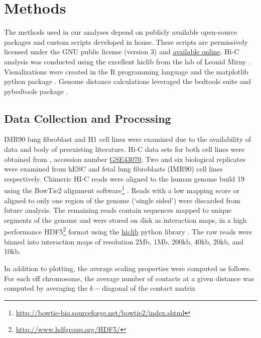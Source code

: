 \chapter{Methods}

The methods used in our analyses depend on publicly available open-source packages and custom scripts developed in house.
These scripts are permissively licensed under the GNU public license (version 3) and
\href{https://github.com/New-College-of-Florida/Jonathan-Niles-Thesis}{\underline{available online}}.  Hi-C analysis was conducted using
the excellent hiclib from the lab of Leonid Mirny \citep{imakaev2012}.  Visualizations were created in the R programming
language \citep{r2014} and the matplotlib python package \citep{hunter2007}.  Genome distance calculations leveraged the
bedtools suite \citep{quinlan2010} and pybedtools package \citep{dale2011}.

\section*{Data Collection and Processing}

IMR90 lung fibroblast and H1  cell lines were examined due to the availability of data and body of preexisting
literature.  Hi-C data sets for both cell lines were obtained from  \citep{edgar2002}, accession number
\href{http://www.ncbi.nlm.nih.gov/geo/query/acc.cgi?acc=GSE43070}{GSE43070}.  Two and six biological replicates were examined from
\gls{hESC} and fetal lung fibroblasts (IMR90) cell lines respectively.  Chimeric HI-C reads were aligned to the human genome build 19 using the BowTie2
alignment software\footnote{\url{http://bowtie-bio.sourceforge.net/bowtie2/index.shtml}} \citep{langmead2012}.  Reads with a low
mapping score or aligned to only one region of the genome (`single sided') were discarded from future analysis.  The remaining reads
contain sequences mapped to unique segments of the genome and were stored on disk as interaction maps, in a high performance
HDF5\footnote{\url{http://www.hdfgroup.org/HDF5/}} format using the \href{https://bitbucket.org/mirnylab/hiclib}{hiclib} python
library \citep{imakaev2012}.  The raw reads were binned into interaction maps of resolution 2Mb, 1Mb, 200kb, 40kb, 20kb, and 10kb.

In addition to plotting, the average scaling properties were computed as follows.  For each off chromosome, the average number of
contacts at a given distance was computed by averaging the $k-$diagonal of the contact matrix

